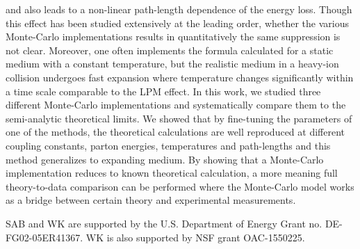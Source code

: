 \documentclass[aps, prc, reprint, amsmath, groupedaddress, nofootinbib]{revtex4-1}
\begin{document}
and also leads to a non-linear path-length dependence of the energy loss.
Though this effect has been studied extensively at the leading order, whether the various Monte-Carlo implementations results in quantitatively the same suppression is not clear. 
Moreover, one often implements the formula calculated for a static medium with a constant temperature, but the realistic medium in a heavy-ion collision undergoes fast expansion where temperature changes significantly within a time scale comparable to the LPM effect.
In this work, we studied three different Monte-Carlo implementations and systematically compare them to the semi-analytic theoretical limits.
We showed that by fine-tuning the parameters of one of the methods, the theoretical calculations are well reproduced at different coupling constants, parton energies, temperatures and path-lengths and this method generalizes to expanding medium. 
By showing that a Monte-Carlo implementation reduces to known theoretical calculation, a more meaning full theory-to-data comparison can be performed where the Monte-Carlo model works as a bridge between certain theory and experimental measurements.



\begin{acknowledgments}
SAB and WK  are supported by the U.S. Department of Energy Grant no. DE-FG02-05ER41367. WK is also supported by NSF grant OAC-1550225.
\end{acknowledgments}

\begin{appendices}
\end{appendices}
 
\end{document}
